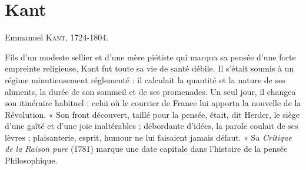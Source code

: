 
\chapter{Kant}

Emmanuel \textsc{Kant}, 1724-1804.

Fils d'un modeste sellier et d'une mère piétiste
qui marqua sa pensée d'une forte empreinte
religieuse, Kant fut toute sa vie de santé
débile. Il s'était soumis à un régime minutieusement réglementé :
il calculait la quantité et la nature de ses aliments, la durée de
son sommeil et de ses promenades. Un seul
jour, il changea son itinéraire habituel :
celui où le courrier de France lui apporta la
nouvelle de la Révolution. « Son front découvert, taillé pour la pensée, était, dit Herder,
le siège d'une gaîté et d'une joie inaltérables ; débordante d'idées, la parole coulait
de ses lèvres ; plaisanterie, esprit, humour
ne lui faisaient jamais défaut. » Sa {\it Critique
de la Raison pure} (1781) marque une date
capitale dans l'histoire de la pensée
Philosophique.


